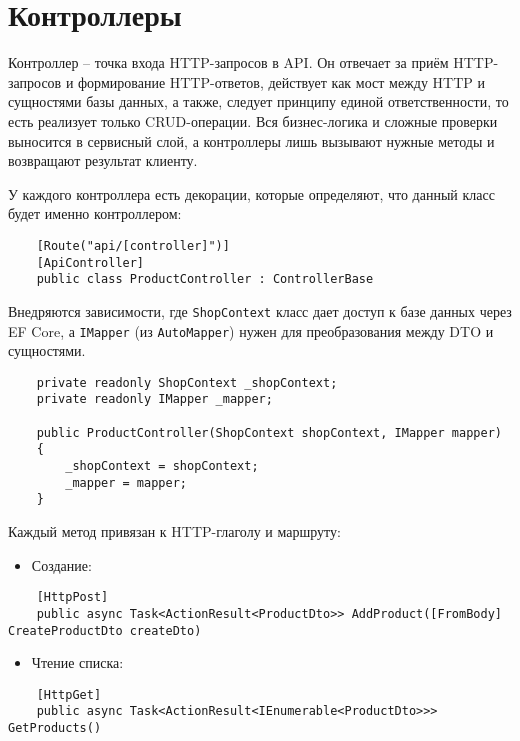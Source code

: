 \documentclass[a4paper,12pt]{report}
\begin{document}
\section{Контроллеры}

Контроллер -- точка входа HTTP-запросов в \acs{API}. Он отвечает за приём \acs{HTTP}-запросов и формирование \acs{HTTP}-ответов, 
действует как мост между \acs{HTTP} и сущностями базы данных, а также, следует принципу единой ответственности, то есть реализует 
только \acs{CRUD}-операции. Вся бизнес-логика и сложные проверки выносится в сервисный слой, а контроллеры лишь вызывают нужные 
методы и возвращают результат клиенту.

У каждого контроллера есть декорации, которые определяют, что данный класс будет именно контроллером:
\begin{verbatim}
    [Route("api/[controller]")]
    [ApiController]
    public class ProductController : ControllerBase
\end{verbatim}

Внедряются зависимости, где \texttt{ShopContext} класс дает доступ к базе данных через \acs{EF} Core, а \texttt{IMapper} (из \texttt{AutoMapper}) 
нужен для преобразования между \acs{DTO} и сущностями.
\begin{verbatim}
    private readonly ShopContext _shopContext;
    private readonly IMapper _mapper;
    
    public ProductController(ShopContext shopContext, IMapper mapper)
    {
        _shopContext = shopContext;
        _mapper = mapper;
    }    
\end{verbatim}

Каждый метод привязан к \acs{HTTP}-глаголу и маршруту:
\begin{itemize}
    \item Создание:
\end{itemize}

\begin{verbatim}
    [HttpPost]
    public async Task<ActionResult<ProductDto>> AddProduct([FromBody] CreateProductDto createDto)
\end{verbatim}

\begin{itemize}
    \item Чтение списка:
\end{itemize}

\begin{verbatim}
    [HttpGet]
    public async Task<ActionResult<IEnumerable<ProductDto>>> GetProducts()
\end{verbatim}
\end{document}
